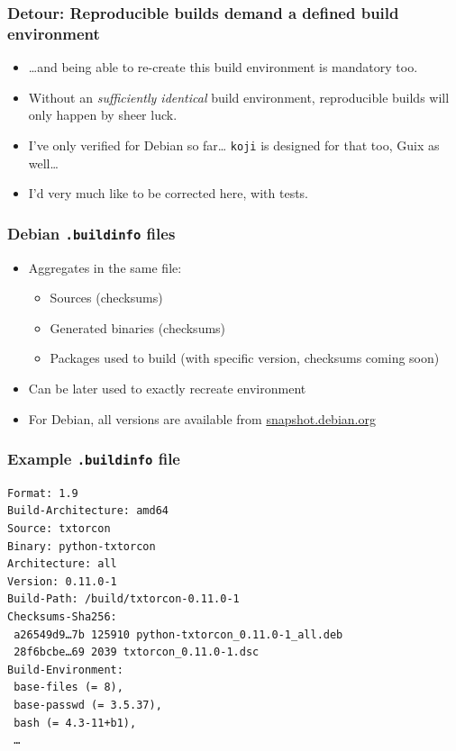 \documentclass[14pt]{beamer}
\begin{document}
\begin{frame}
 \frametitle{Detour: Reproducible builds demand a defined build environment}
 \begin{itemize}
  \item …and being able to re-create this build environment is mandatory too.
  \item Without an \textit{sufficiently identical} build environment, reproducible builds will only
  happen by sheer luck.
  \item<2>{I've only verified for Debian so far… \texttt{koji}
  is designed for that too, Guix as well…}
\item<2> {I'd very much like to be corrected here, with tests.}
 \end{itemize}
\end{frame}


\begin{frame}
 \frametitle{Debian \texttt{.buildinfo} files}

 \begin{itemize}
  \item Aggregates in the same file:
   \begin{itemize}
    \item Sources (checksums)
    \item Generated binaries (checksums)
    \item Packages used to build (with specific version, checksums coming soon)
   \end{itemize}
  \item Can be later used to exactly recreate environment
  \item For Debian, all versions are available from \url{snapshot.debian.org}
 \end{itemize}
\end{frame}


\begin{frame}[fragile]
 \frametitle{Example \texttt{.buildinfo} file}

{\small
\begin{verbatim}
Format: 1.9
Build-Architecture: amd64
Source: txtorcon
Binary: python-txtorcon
Architecture: all
Version: 0.11.0-1
Build-Path: /build/txtorcon-0.11.0-1
Checksums-Sha256:
 a26549d9…7b 125910 python-txtorcon_0.11.0-1_all.deb
 28f6bcbe…69 2039 txtorcon_0.11.0-1.dsc
Build-Environment:
 base-files (= 8),
 base-passwd (= 3.5.37),
 bash (= 4.3-11+b1),
 …
\end{verbatim}
}
\end{frame}
\end{document}
